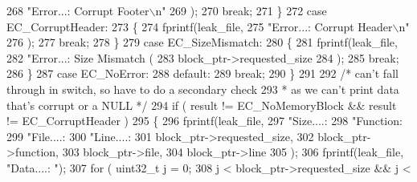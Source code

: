 \begin{DoxyCode}
{{{{{{{{{268                                         \textcolor{stringliteral}{"Error...: Corrupt Footer\(\backslash\)n"}
269                                 );
270                                 \textcolor{keywordflow}{break};
271                         \}
272                 \textcolor{keywordflow}{case} EC_CorruptHeader:
273                         \{
274                                 fprintf(leak\_file,
275                                         \textcolor{stringliteral}{"Error...: Corrupt Header\(\backslash\)n"}
276                                 );
277                                 \textcolor{keywordflow}{break};
278                         \}
279                 \textcolor{keywordflow}{case} EC_SizeMismatch:
280                         \{
281                                 fprintf(leak\_file,
282                                         \textcolor{stringliteral}{"Error...: Size Mismatch (%
283                                         block\_ptr->requested_size
284                                 );
285                                 \textcolor{keywordflow}{break};
286                         \}
287                 \textcolor{keywordflow}{case} EC_NoError:
288                 \textcolor{keywordflow}{default}:
289                         \textcolor{keywordflow}{break};
290                 \}
291 
292                 \textcolor{comment}{/* can't fall through in switch, so have to do a secondary check
}
293 \textcolor{comment}{                 * as we can't print data that's corrupt or a NULL */}
294                 \textcolor{keywordflow}{if} ( result != EC_NoMemoryBlock && result != EC_CorruptHeader )
295                 \{
296                         fprintf(leak\_file,
297                                 \textcolor{stringliteral}{"Size....: %
298                                 \textcolor{stringliteral}{"Function: %
299                                 \textcolor{stringliteral}{"File....: %
300                                 \textcolor{stringliteral}{"Line....: %
301                                 block\_ptr->requested_size,
302                                 block\_ptr->function,
303                                 block\_ptr->file,
304                                 block\_ptr->line
305                         );
306                         fprintf(leak\_file, \textcolor{stringliteral}{"Data....: "});
307                         \textcolor{keywordflow}{for} ( uint32\_t j = 0;
308                                 j < block\_ptr->requested_size && j < 
}}}}}}}}}}}}}}
\end{DoxyCode}
